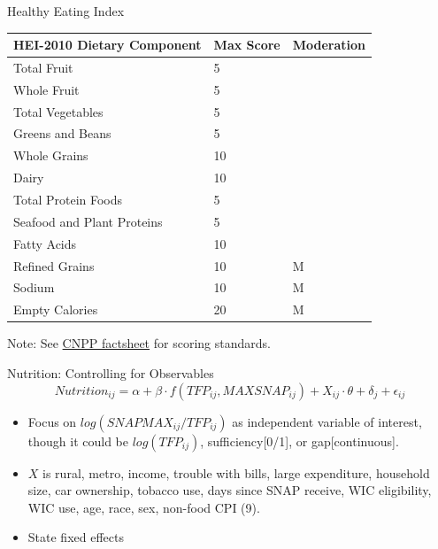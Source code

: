 \documentclass{beamer}
\begin{document}
\begin{frame}{Healthy Eating Index}
\begin{table}{}
\begin{tabular}{lll}

HEI-2010 Dietary Component & Max Score & Moderation \\
\toprule
Total Fruit & 5 & \\
Whole Fruit & 5 & \\
Total Vegetables & 5& \\
Greens and Beans & 5 &\\
Whole Grains & 10 &\\
Dairy & 10& \\
Total Protein Foods & 5& \\
Seafood and Plant Proteins & 5& \\
Fatty Acids & 10& \\
Refined Grains & 10& M \\
Sodium & 10 & M\\
Empty Calories & 20&  M \\
\bottomrule 
\end{tabular}
\end{table}
\begin{tiny}\begin{center}
Note: See \href{https://www.cnpp.usda.gov/sites/default/files/healthy_eating_index/CNPPFactSheetNo2.pdf}{CNPP factsheet} for scoring standards. \end{center}\end{tiny}
\end{frame}


\begin{frame}{Nutrition: Controlling for Observables}
 $$Nutrition_{ij}=\alpha + \beta \cdot f(TFP_{ij}, MAXSNAP_{ij}) + X_{ij} \cdot \theta + \delta_{j}+\epsilon_{ij} $$
 
\begin{itemize}
\item Focus on $log(SNAPMAX_{ij}/TFP_{ij})$ as independent variable of interest, though it could be $log (TFP_{ij})$, sufficiency[0/1], or gap[continuous].
\item $X$ is rural, metro, income, trouble with bills, large expenditure, household size, car ownership, tobacco use, days since SNAP receive, WIC eligibility, WIC use, age, race, sex, non-food CPI (9).
\item State fixed effects
\end{itemize}
\end{frame}
\end{document}
